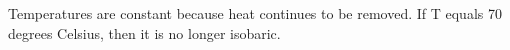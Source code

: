 Temperatures are constant because heat continues to be removed. If T equals 70 degrees Celsius, then it is no longer isobaric.